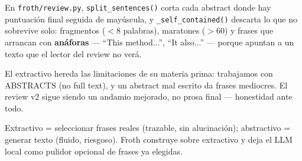 \documentclass[11pt,a4paper]{article}
\begin{document}
En \texttt{froth/review.py}, \texttt{split\_sentences()} corta cada abstract donde hay
puntuación final seguida de mayúscula, y \texttt{\_self\_contained()} descarta lo que no
sobrevive solo: fragmentos ($<$8 palabras), maratones ($>$60) y frases que arrancan con
\textbf{anáforas} --- ``This method...'', ``It also...'' --- porque apuntan a un texto que
el lector del review no verá.

\begin{ojo}
El extractivo hereda las limitaciones de su materia prima: trabajamos con ABSTRACTS
(no full text), y un abstract mal escrito da frases mediocres. El review v2 sigue siendo
un andamio mejorado, no prosa final --- honestidad ante todo.
\end{ojo}

\begin{resumen}
Extractivo = seleccionar frases reales (trazable, sin alucinación); abstractivo = generar
texto (fluido, riesgoso). Froth construye sobre extractivo y deja el LLM local como
pulidor opcional de frases ya elegidas.
\end{resumen}
\end{document}
